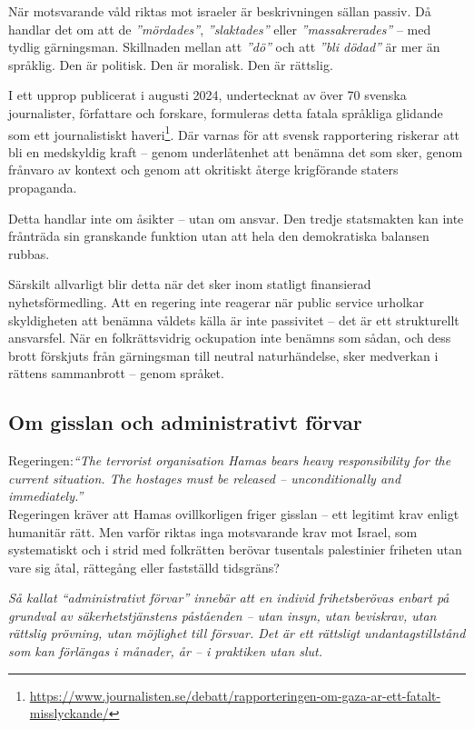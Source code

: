 När motsvarande våld riktas mot israeler är beskrivningen sällan passiv. Då handlar det om att de \textit{”mördades”}, \textit{”slaktades”} eller \textit{”massakrerades”} – med tydlig gärningsman. Skillnaden mellan att \textit{”dö”} och att \textit{”bli dödad”} är mer än språklig. Den är politisk. Den är moralisk. Den är rättslig.

I ett upprop publicerat i augusti 2024, undertecknat av över 70 svenska journalister, författare och forskare, formuleras detta fatala språkliga glidande som ett journalistiskt haveri\footnote{\url{https://www.journalisten.se/debatt/rapporteringen-om-gaza-ar-ett-fatalt-misslyckande/}}. Där varnas för att svensk rapportering riskerar att bli en medskyldig kraft – genom underlåtenhet att benämna det som sker, genom frånvaro av kontext och genom att okritiskt återge krigförande staters propaganda.

Detta handlar inte om åsikter – utan om ansvar. Den tredje statsmakten kan inte frånträda sin granskande funktion utan att hela den demokratiska balansen rubbas.

Särskilt allvarligt blir detta när det sker inom statligt finansierad nyhetsförmedling. Att en regering inte reagerar när public service urholkar skyldigheten att benämna våldets källa är inte passivitet – det är ett strukturellt ansvarsfel. När en folkrättsvidrig ockupation inte benämns som sådan, och dess brott förskjuts från gärningsman till neutral naturhändelse, sker medverkan i rättens sammanbrott – genom språket.



\subsection*{Om gisslan och administrativt förvar}

Regeringen:\textit{“The terrorist organisation Hamas bears heavy responsibility for the current situation. The hostages must be released – unconditionally and immediately.”}\\

Regeringen kräver att Hamas ovillkorligen friger gisslan – ett legitimt krav enligt humanitär rätt. Men varför riktas inga motsvarande krav mot Israel, som systematiskt och i strid med folkrätten berövar tusentals palestinier friheten utan vare sig åtal, rättegång eller fastställd tidsgräns?

\textit{Så kallat “administrativt förvar” innebär att en individ frihetsberövas enbart på grundval av säkerhetstjänstens påståenden – utan insyn, utan beviskrav, utan rättslig prövning, utan möjlighet till försvar. Det är ett rättsligt undantagstillstånd som kan förlängas i månader, år – i praktiken utan slut.}

